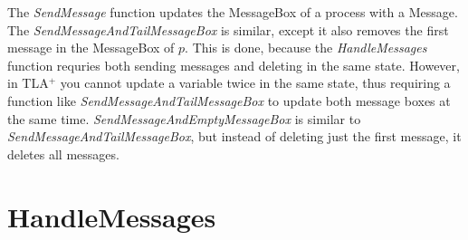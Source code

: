 \documentclass{report}
\begin{document}
The \textit{SendMessage} function updates the MessageBox of a process with a Message. The \textit{SendMessageAndTailMessageBox} is similar, except it also removes the first message in the MessageBox of $p$. This is done, because the \textit{HandleMessages} function requries both sending messages and deleting in the same state. However, in TLA$^{+}$ you cannot update a variable twice in the same state, thus requiring a function like \textit{SendMessageAndTailMessageBox} to update both message boxes at the same time. \textit{SendMessageAndEmptyMessageBox} is similar to \textit{SendMessageAndTailMessageBox}, but instead of deleting just the first message, it deletes all messages.






\section{HandleMessages}
\end{document}
